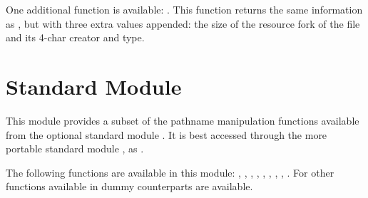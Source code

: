 One additional function is available: . This function
returns the same information as , but with three extra
values appended: the size of the resource fork of the file and its
4-char creator and type.

\section{Standard Module }

This module provides a subset of the pathname manipulation functions
available from the optional standard module .  It is
best accessed through the more portable standard module , as
.

The following functions are available in this module:
,
,
,
,
,
,
,
,
.
For other functions available in  dummy counterparts
are available.
